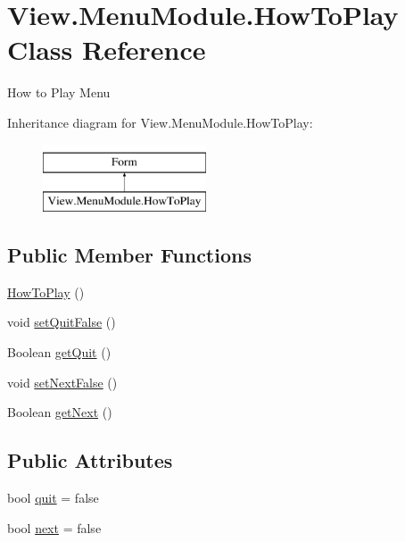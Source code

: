 \hypertarget{class_view_1_1_menu_module_1_1_how_to_play}{}\section{View.\+Menu\+Module.\+How\+To\+Play Class Reference}
\label{class_view_1_1_menu_module_1_1_how_to_play}


How to Play Menu  


Inheritance diagram for View.\+Menu\+Module.\+How\+To\+Play\+:\begin{figure}[H]
\begin{center}
\leavevmode
\includegraphics[height=2.000000cm]{class_view_1_1_menu_module_1_1_how_to_play}
\end{center}
\end{figure}
\subsection*{Public Member Functions}
\begin{DoxyCompactItemize}
\item 
\hyperlink{class_view_1_1_menu_module_1_1_how_to_play_a78140fa357d8f951aabc5b44ac50591e}{How\+To\+Play} ()
\item 
void \hyperlink{class_view_1_1_menu_module_1_1_how_to_play_a0af74e6533be263c25e9f62a50135b43}{set\+Quit\+False} ()
\item 
Boolean \hyperlink{class_view_1_1_menu_module_1_1_how_to_play_a08017898efa214bb31463d11875ed6d0}{get\+Quit} ()
\item 
void \hyperlink{class_view_1_1_menu_module_1_1_how_to_play_a69475818d4ea1d67f02abd8b88ba912f}{set\+Next\+False} ()
\item 
Boolean \hyperlink{class_view_1_1_menu_module_1_1_how_to_play_a5c48be1846170e30469c7523d95c2758}{get\+Next} ()
\end{DoxyCompactItemize}
\subsection*{Public Attributes}
\begin{DoxyCompactItemize}
\item 
bool \hyperlink{class_view_1_1_menu_module_1_1_how_to_play_abd2452f664d2ed8d490175758b1c0806}{quit} = false
\item 
bool \hyperlink{class_view_1_1_menu_module_1_1_how_to_play_aa27b8e6545eddc0a338df1a0ac60eeb1}{next} = false
\end{DoxyCompactItemize}
